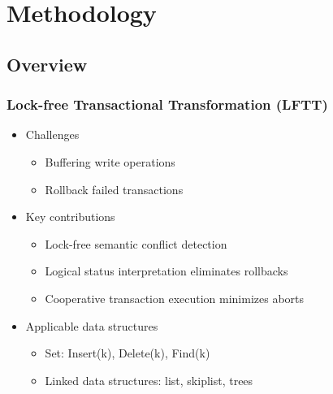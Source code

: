 \documentclass{beamer}
\begin{document}
\section{Methodology}
\subsection{Overview}
\begin{frame} \frametitle{Lock-free Transactional Transformation (LFTT)}
    \begin{itemize}
        \item Challenges
            \begin{itemize}
                \item Buffering write operations
                \item Rollback failed transactions
            \end{itemize}
        \item<2-> Key contributions
            \begin{itemize}
                \item Lock-free semantic conflict detection
                \item Logical status interpretation eliminates rollbacks
                \item Cooperative transaction execution minimizes aborts
            \end{itemize}
        \item<3> Applicable data structures
            \begin{itemize}
                \item Set: Insert(k), Delete(k), Find(k)
                \item Linked data structures: list, skiplist, trees
            \end{itemize}
    \end{itemize}
\end{frame}
\end{document}
